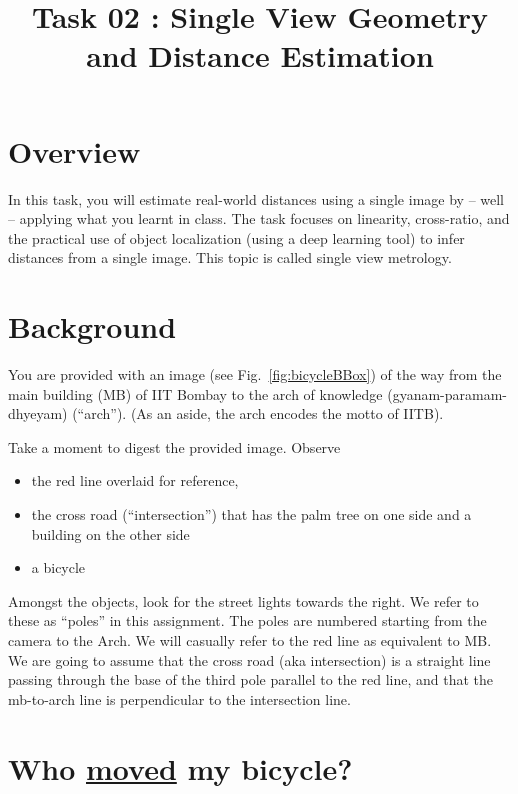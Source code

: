 \documentclass[12pt,a4paper]{article}
\title{Task 02 : Single View Geometry and Distance Estimation}
\author{}
\date{}
\begin{document}
\maketitle

\section{Overview}

In this task, you will estimate real-world distances using a single
image by -- well -- applying what you learnt in class. The task
focuses on linearity, cross-ratio, and the practical use
of object localization (using a deep learning tool) to infer
distances from a single image. This topic is called single view metrology.

\section{Background}

You are provided with an image (see Fig.~\ref{fig:bicycleBBox}) of
the way from the main building
(MB) of IIT Bombay to the arch of knowledge (gyanam-paramam-dhyeyam) (``arch''). (As an aside, the arch encodes the motto of IITB).

Take a moment to digest the provided image. Observe
\begin{itemize}
\item the red line overlaid for reference,
\item the cross road (``intersection'') that has the palm tree on one side and a building
on the other side
\item a bicycle
\end{itemize}

Amongst the objects, look for the street lights towards the right. We refer to these as
``poles'' in this assignment. The poles are numbered starting from the camera to the Arch. We will casually refer to the red line as equivalent to MB.
We are
going to assume that the cross road (aka intersection) is a straight line passing
through the base of the third pole parallel to the red
line, and that the mb-to-arch line is perpendicular to
the intersection line.

\section{Who \href{https://en.wikipedia.org/wiki/Who_Moved_My_Cheese\%3F}{moved} my bicycle?}
\end{document}
